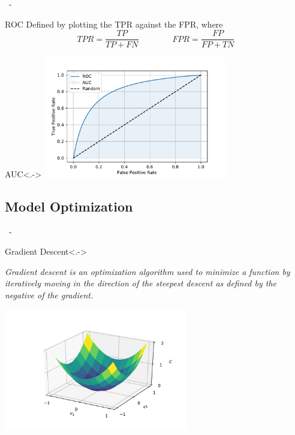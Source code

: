 \documentclass{beamer}
\newenvironment{xframe}
    {\begin{frame}{
        \ifx\insertsubsection\empty
            \strut
        \else\ifx\insertsubsubsection\empty
            \insertsection
        \else
            \insertsection~-~\insertsubsection
        \fi\fi
    }{
        \ifx\insertsubsection\empty
            \insertsection
        \else\ifx\insertsubsubsection\empty
            \insertsubsection
        \else
            \insertsubsubsection
        \fi\fi
    }}
    {\end{frame}}
\newenvironment{xblock}[1]
    {\begin{block}{#1}}
    {\end{block}}
\begin{document}
    \begin{xframe}
        \begin{xblock}{ROC}
            Defined by plotting the TPR against the FPR, where
            \[TPR = \frac{TP}{TP + FN} \qquad\qquad FPR = \frac{FP}{FP + TN}\]
        \end{xblock}
        
        \begin{xblock}{AUC}<.->
            \centering
            \includegraphics[trim=0 0 0 1cm, clip, width=0.6\textwidth]{contents/figures/Method/AUC-ROC-Curve}
        \end{xblock}
    
    \end{xframe}
    
    \subsection{Model Optimization}
    \begin{xframe}
        \begin{xblock}{Gradient Descent}<.->
            \begin{displayquote}\itshape
                Gradient descent is an optimization algorithm used to minimize a function by iteratively moving in the direction of the steepest descent as defined by the negative of the gradient. 
            \end{displayquote}
            \centering
            \includegraphics[trim=2.75cm 1cm 0.75cm 1.5cm, clip,width=0.6\textwidth]{contents/figures/Method/Gradient-Descent}
        \end{xblock}
    \end{xframe}
    
\end{document}

